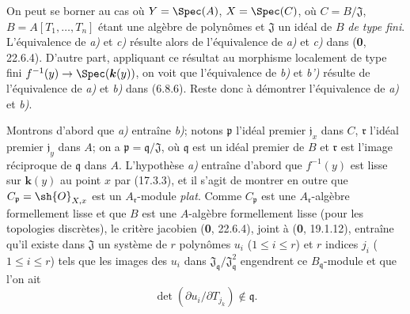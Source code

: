 On peut se borner au cas où $Y=\Spec(A)$, $X=\Spec(C)$, où $C=B/\mathfrak{J}$, $B=A[T_1,\ldots,T_n]$ étant une algèbre de polynômes et $\mathfrak{J}$ un idéal de $B$ \emph{de type fini}. L'équivalence de \emph{a)} et \emph{c)} résulte alors de l'équivalence de \emph{a)} et \emph{c)} dans (\textbf{0}, 22.6.4). D'autre part, appliquant ce résultat au morphisme localement de type fini $f^{-1}(y)\to\Spec(\boldsymbol{k}(y))$, on voit que l'équivalence de \emph{b)} et \emph{b')} résulte de l'équivalence de \emph{a)} et \emph{b)} dans (6.8.6). Reste donc à démontrer l'équivalence de \emph{a)} et \emph{b)}.

Montrons d'abord que \emph{a)} entraîne \emph{b)}; notons $\mathfrak p$ l'idéal premier $\mathfrak j_x$ dans $C$, $\mathfrak r$ l'idéal premier $\mathfrak j_y$ dans $A$; on a $\mathfrak p=\mathfrak q/\mathfrak J$, où $\mathfrak q$ est un idéal premier de $B$ et $\mathfrak r$ est l'image réciproque de $\mathfrak q$ dans $A$. L'hypothèse \emph{a)} entraîne d'abord que $f^{-1}(y)$ est lisse sur $\boldsymbol{k}(y)$ au point $x$ par (17.3.3), et il s'agit de montrer en outre que $C_{\mathfrak p}=\sh{O}_{X,x}$ est un $A_{\mathfrak r}$-module \emph{plat}. Comme $C_{\mathfrak p}$ est une $A_{\mathfrak r}$-algèbre formellement lisse et que $B$ est une $A$-algèbre formellement lisse (pour les topologies discrètes), le critère jacobien (\textbf{0}, 22.6.4), joint à (\textbf{0}, 19.1.12), entraîne qu'il existe dans $\mathfrak J$ un système de $r$ polynômes $u_i$ ($1\leq i\leq r$) et $r$ indices $j_i$ ($1\leq i\leq r$) tels que les images des $u_i$ dans $\mathfrak J_{\mathfrak q}/\mathfrak J_{\mathfrak q}^2$ engendrent ce $B_{\mathfrak q}$-module et que l'on ait
\[
\label{IV.17.5.1.1}
\det(\partial u_i/\partial T_{j_k})\notin\mathfrak q.
\tag{17.5.1.1}
\]

